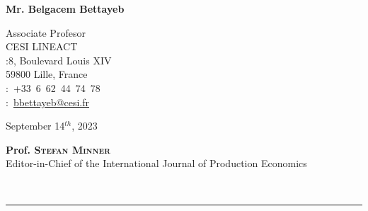 \documentclass[a4,12pt]{article}
\begin{document}
	\sffamily
	\hfill
	
	\hfill    \begin{minipage}[t]{.5\textwidth}
		\raggedleft
		{\bfseries Mr. Belgacem Bettayeb}%
		
		\raggedleft
		\small
		Associate Profesor\\ 
  CESI LINEACT\\
		\Letter :8, Boulevard Louis XIV \\
                    59800 Lille, France\\ 
		\Telefon :~+33~6~62~44~74~78\\
		\Email :~\href{nbouaziz@cesi.fr}{bbettayeb@cesi.fr}
	\end{minipage}\normalsize
	
	\bigskip
	
	\begin{minipage}[t]{0.365\textwidth}
		\begin{flushleft}
			September 14$^{th}$, 2023 
		\end{flushleft} 
	\end{minipage}
	\bigskip
	
	\begin{minipage}[t]{.85\textwidth}
		\raggedright
		\small
        \textbf{Prof. \textsc{Stefan Minner}} \\
		Editor-in-Chief of the International Journal of Production Economics\\
	\end{minipage}\\
	
	\hspace{-2.6cm}	\rule{1cm}{0.1mm}\\ \vspace{-1\baselineskip}
	
\end{document}
